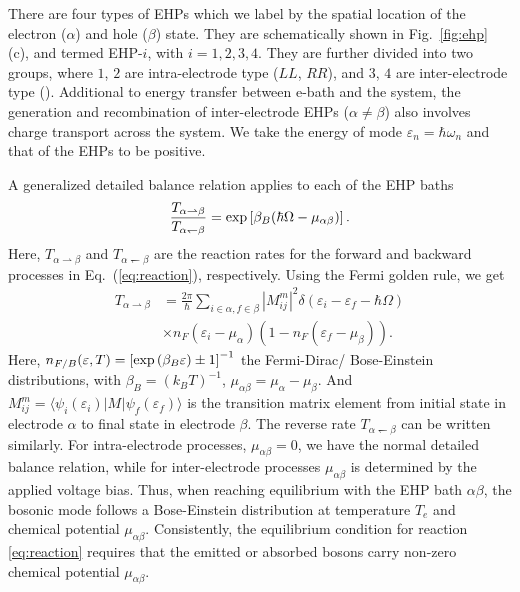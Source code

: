 \documentclass[aps
,twocolumn
,floatfix,footinbib,prl
]{revtex4-1}
\newcommand{\revision}[1]{{\color{blue}{#1}}}
\begin{document}
There are four types of EHPs which we label by the spatial location of the electron ($\alpha$) and hole  ($\beta$) state. They are schematically shown in Fig.~\ref{fig:ehp} (c), and termed EHP-$i$, with $i=1,2,3,4$. They are further divided into two groups, where $1$, $2$ are intra-electrode type ($LL$, $RR$), and $3$, $4$ are inter-electrode type (\revision{$RL$, $LR$}). Additional to energy transfer between e-bath and the system, the generation and recombination of inter-electrode EHPs ($\alpha\neq \beta$) also involves charge transport across the system. We take the energy of mode  $\varepsilon_n=\hbar\omega_n$ and that of the EHPs to be positive. 


A generalized detailed balance relation applies to each of the EHP baths
\begin{align}
\frac{T_{\alpha\rightharpoonup\beta}}{T_{\alpha\leftharpoondown\beta}} = {\rm exp}\left[\beta_B(\hbar\Omega-\mu_{\alpha\beta})\right].
\end{align}
Here, $T_{\alpha\rightharpoonup\beta}$ and $T_{\alpha\leftharpoondown\beta}$ are the reaction rates for the forward and backward processes in Eq.~(\ref{eq:reaction}), respectively. Using the Fermi golden rule, we get
\begin{align}
T_{\alpha\rightharpoonup\beta} &= \frac{2\pi}{\hbar}\sum_{i\in\alpha,f\in\beta}|M^m_{ij}|^2  \delta(\varepsilon_i-\varepsilon_f-\hbar\Omega)  \nonumber\\
&\times n_F(\varepsilon_i-\mu_\alpha)(1-n_F(\varepsilon_f-\mu_\beta)).
\end{align}
Here, $n_{F/B}(\varepsilon,T) = \left[{\rm exp}\left(\beta_B \varepsilon\right)\pm 1\right]^{-1}$ the Fermi-Dirac/ Bose-Einstein distributions, with $\beta_B=(k_BT)^{-1}$, $\mu_{\alpha\beta}=\mu_\alpha-\mu_\beta$. And $M^m_{ij}=\langle \psi_{i}(\varepsilon_i)|M^{}|\psi_{f}(\varepsilon_f)\rangle$ is the transition matrix element from initial state in electrode $\alpha$ to final state in electrode $\beta$. The reverse rate $T_{\alpha\leftharpoondown\beta}$ can be written similarly.
For intra-electrode processes, $\mu_{\alpha\beta}=0$, we have the normal detailed balance relation, while for inter-electrode processes $\mu_{\alpha\beta}$ is determined by the applied voltage bias. Thus, when reaching equilibrium with the EHP bath $\alpha\beta$, the bosonic mode follows a Bose-Einstein distribution at temperature $T_e$ and chemical potential $\mu_{\alpha\beta}$. Consistently, the equilibrium condition for reaction \ref{eq:reaction} requires that the emitted or absorbed bosons carry non-zero chemical potential $\mu_{\alpha\beta}$.
\end{document}
